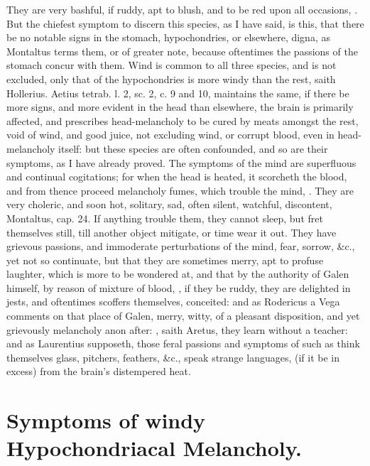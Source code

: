 {They are very bashful, if ruddy, apt to blush, and to be red upon all
occasions, . But the chiefest symptom to
discern this species, as I have said, is this, that there be no notable
signs in the stomach, hypochondries, or elsewhere, digna, as
Montaltus terms them, or of greater note, because oftentimes the
passions of the stomach concur with them. Wind is common to all three
species, and is not excluded, only that of the hypochondries is
more windy than the rest, saith Hollerius. Aetius tetrab. l. 2,
sc. 2, c. 9 and 10, maintains the same, if there be more signs,
and more evident in the head than elsewhere, the brain is primarily
affected, and prescribes head-melancholy to be cured by meats amongst
the rest, void of wind, and good juice, not excluding wind, or corrupt
blood, even in head-melancholy itself: but these species are often
confounded, and so are their symptoms, as I have already proved. The
symptoms of the mind are superfluous and continual cogitations;
for when the head is heated, it scorcheth the blood, and from
thence proceed melancholy fumes, which trouble the mind, \Avicenna{}. They
are very choleric, and soon hot, solitary, sad, often silent, watchful,
discontent, Montaltus, cap. 24. If anything trouble them, they cannot
sleep, but fret themselves still, till another object mitigate, or time
wear it out. They have grievous passions, and immoderate perturbations
of the mind, fear, sorrow, \&c., yet not so continuate, but that they
are sometimes merry, apt to profuse laughter, which is more to be
wondered at, and that by the authority of Galen himself, by
reason of mixture of blood, , if they be ruddy, they are delighted in jests, and
oftentimes scoffers themselves, conceited: and as Rodericus a Vega
comments on that place of Galen, merry, witty, of a pleasant
disposition, and yet grievously melancholy anon after: , saith Aretus, they learn without a teacher: and as
Laurentius supposeth, those feral passions and symptoms of such
as think themselves glass, pitchers, feathers, \&c., speak strange
languages,  (if it be in excess) from the brain's
distempered heat.

\section{Symptoms of windy Hypochondriacal Melancholy.}

}
